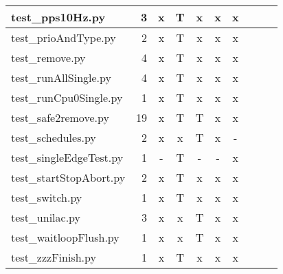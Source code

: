 \documentclass[12pt,a4paper]{report}
\begin{document}
\begin{table}
\begin{tabular}[t]{|l|r|c|c|c|c|c|c|c|c|}
test\_pps10Hz.py                        &  3                  &   x        &   T             &   x           &   x              &   x                 \\ \hline
test\_prioAndType.py                    &  2                  &   x        &   T             &   x           &   x              &   x                 \\ \hline
test\_remove.py                         &  4                  &   x        &   T             &   x           &   x              &   x                 \\ \hline
test\_runAllSingle.py                   &  4                  &   x        &   T             &   x           &   x              &   x                 \\ \hline
test\_runCpu0Single.py                  &  1                  &   x        &   T             &   x           &   x              &   x                 \\ \hline
test\_safe2remove.py                    &  19                 &   x        &   T             &   T           &   x              &   x                 \\ \hline
test\_schedules.py                      &  2                  &   x        &   x             &   T           &   x              &   -                 \\ \hline
test\_singleEdgeTest.py                 &  1                  &   -        &   T             &   -           &   -              &   x                 \\ \hline
test\_startStopAbort.py                 &  2                  &   x        &   T             &   x           &   x              &   x                 \\ \hline
test\_switch.py                         &  1                  &   x        &   T             &   x           &   x              &   x                 \\ \hline
test\_unilac.py                         &  3                  &   x        &   x             &   T           &   x              &   x                 \\ \hline
test\_waitloopFlush.py                  &  1                  &   x        &   x             &   T           &   x              &   x                 \\ \hline
test\_zzzFinish.py                      &  1                  &   x        &   T             &   x           &   x              &   x                 \\ \hline
\end{tabular}
\end{table}
\end{document}
